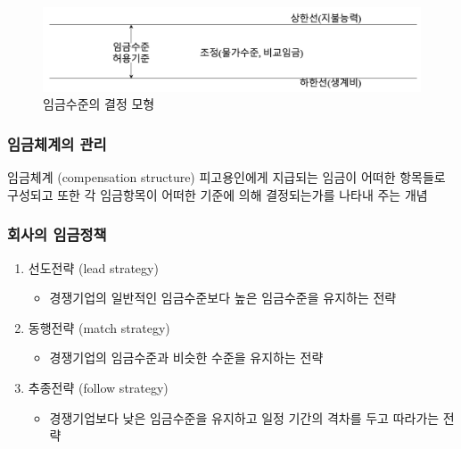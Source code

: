 \documentclass[aspectratio=169,xcolor=dvipsnames,handout]{beamer}
\begin{document}
\begin{frame}[allowframebreaks]
\begin{enumerate}[<+->]
\begin{itemize}[<+->]
            \end{itemize}
    \end{enumerate}
    \centering
    \begin{figure}
        \includegraphics[width=.8\textwidth]{pic/임금수준}
        \caption{임금수준의 결정 모형}
    \end{figure}
\end{frame}

\begin{frame}[allowframebreaks]
    \frametitle{임금체계의 관리}
    \begin{block}{임금체계 (compensation structure)}
        피고용인에게 지급되는 임금이 어떠한 항목들로 구성되고 또한 각 임금항목이 어떠한 기준에 의해 결정되는가를 나타내 주는 개념
    \end{block}
    \begin{table}
        \centering
        \resizebox{.63\textwidth}{!}{\relax
            
        }
        \caption{임금체계 비교}
    \end{table}
\end{frame}

\begin{frame}[allowframebreaks]
    \frametitle{회사의 임금정책}
    \begin{enumerate}[<+->]
        \item 선도전략 (lead strategy)
        \begin{itemize}[<+->]
            \item 경쟁기업의 일반적인 임금수준보다 높은 임금수준을 유지하는 전략
        \end{itemize}
        \item 동행전략 (match strategy)
        \begin{itemize}[<+->]
            \item 경쟁기업의 임금수준과 비슷한 수준을 유지하는 전략
        \end{itemize}
        \item 추종전략 (follow strategy)
        \begin{itemize}[<+->]
            \item 경쟁기업보다 낮은 임금수준을 유지하고 일정 기간의 격차를 두고 따라가는 전략
        \end{itemize}
    \end{enumerate}
\end{frame}
\end{document}
